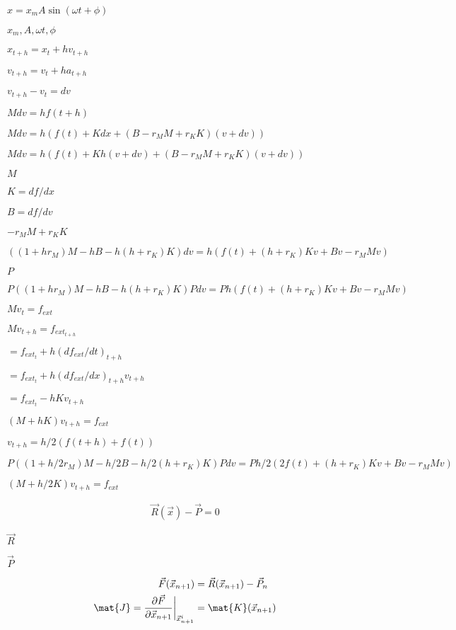 \documentclass{article}
\begin{document}
$ x = x_m A \sin ( \omega t + \phi )$
\pagebreak

$ x_m, A , \omega t , \phi $
\pagebreak

$x_{t+h} = x_t + h v_{t+h}$
\pagebreak

$v_{t+h} = v_t + h a_{t+h}$
\pagebreak

$v_{t+h} - v_t = dv$
\pagebreak

$ M dv = h f(t+h) $
\pagebreak

$ M dv = h ( f(t) + K dx + (B - r_M M + r_K K) (v+dv) )$
\pagebreak

$ M dv = h ( f(t) + K h (v+dv) + (B - r_M M + r_K K) (v+dv) )$
\pagebreak

$ M $
\pagebreak

$ K = df/dx $
\pagebreak

$ B = df/dv $
\pagebreak

$- r_M M + r_K K$
\pagebreak

$ ( (1+h r_M) M - h B - h(h + r_K) K ) dv = h ( f(t) + (h+r_K) K v + B v - r_M M v )$
\pagebreak

$P$
\pagebreak

$ P ( (1+h r_M) M - h B - h(h + r_K) K ) P dv = P h ( f(t) + (h + r_K) K v + B v - r_M M v )$
\pagebreak

$ M v_t = f_{ext} $
\pagebreak

$ M v_{t+h} = f_{ext_{t+h}} $
\pagebreak

$ = f_{ext_{t}} + h (df_{ext}/dt)_{t+h} $
\pagebreak

$ = f_{ext_{t}} + h (df_{ext}/dx)_{t+h} v_{t+h} $
\pagebreak

$ = f_{ext_{t}} - h K v_{t+h} $
\pagebreak

$ ( M + h K ) v_{t+h} = f_{ext} $
\pagebreak

$v_{t+h} = h/2 ( f(t+h) + f(t) )$
\pagebreak

$ P ( (1+h/2 r_M) M - h/2 B - h/2 (h + r_K) K ) P dv = P h/2 ( 2 f(t) + (h + r_K) K v + B v - r_M M v )$
\pagebreak

$ ( M + h/2 K ) v_{t+h} = f_{ext} $
\pagebreak

\begin{eqnarray*} \vec{R}(\vec{x}) - \vec{P} = 0 \end{eqnarray*}
\pagebreak

$\vec{R}$
\pagebreak

$\vec{P}$
\pagebreak

\begin{align*} \vec{F}(\vec{x}_{n+1}) &= \vec{R}(\vec{x}_{n+1}) - \vec{P}_n \\ \mat{J} = \frac{\partial \vec{F}}{\partial \vec{x}_{n+1}} \bigg\rvert_{\vec{x}_{n+1}^i} &= \mat{K}(\vec{x}_{n+1}) \end{align*}
\pagebreak
\end{document}
